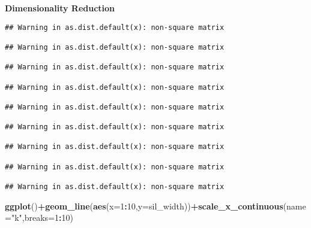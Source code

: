 \documentclass[]{article}
\newenvironment{Shaded}{\begin{snugshade}}{\end{snugshade}}
\newcommand{\CommentTok}[1]{\textcolor[rgb]{0.56,0.35,0.01}{\textit{#1}}}
\newcommand{\ControlFlowTok}[1]{\textcolor[rgb]{0.13,0.29,0.53}{\textbf{#1}}}
\newcommand{\DataTypeTok}[1]{\textcolor[rgb]{0.13,0.29,0.53}{#1}}
\newcommand{\DecValTok}[1]{\textcolor[rgb]{0.00,0.00,0.81}{#1}}
\newcommand{\KeywordTok}[1]{\textcolor[rgb]{0.13,0.29,0.53}{\textbf{#1}}}
\newcommand{\NormalTok}[1]{#1}
\newcommand{\OperatorTok}[1]{\textcolor[rgb]{0.81,0.36,0.00}{\textbf{#1}}}
\newcommand{\OtherTok}[1]{\textcolor[rgb]{0.56,0.35,0.01}{#1}}
\newcommand{\StringTok}[1]{\textcolor[rgb]{0.31,0.60,0.02}{#1}}
\begin{document}
\textbf{Dimensionality Reduction}

\begin{Shaded}
\end{Shaded}

\begin{verbatim}
## Warning in as.dist.default(x): non-square matrix

## Warning in as.dist.default(x): non-square matrix

## Warning in as.dist.default(x): non-square matrix

## Warning in as.dist.default(x): non-square matrix

## Warning in as.dist.default(x): non-square matrix

## Warning in as.dist.default(x): non-square matrix

## Warning in as.dist.default(x): non-square matrix

## Warning in as.dist.default(x): non-square matrix

## Warning in as.dist.default(x): non-square matrix
\end{verbatim}

\begin{Shaded}
\begin{Highlighting}[]
\KeywordTok{ggplot}\NormalTok{()}\OperatorTok{+}\KeywordTok{geom_line}\NormalTok{(}\KeywordTok{aes}\NormalTok{(}\DataTypeTok{x=}\DecValTok{1}\OperatorTok{:}\DecValTok{10}\NormalTok{,}\DataTypeTok{y=}\NormalTok{sil_width))}\OperatorTok{+}\KeywordTok{scale_x_continuous}\NormalTok{(}\DataTypeTok{name=}\StringTok{"k"}\NormalTok{,}\DataTypeTok{breaks=}\DecValTok{1}\OperatorTok{:}\DecValTok{10}\NormalTok{)}
\end{Highlighting}
\end{Shaded}
\end{document}
